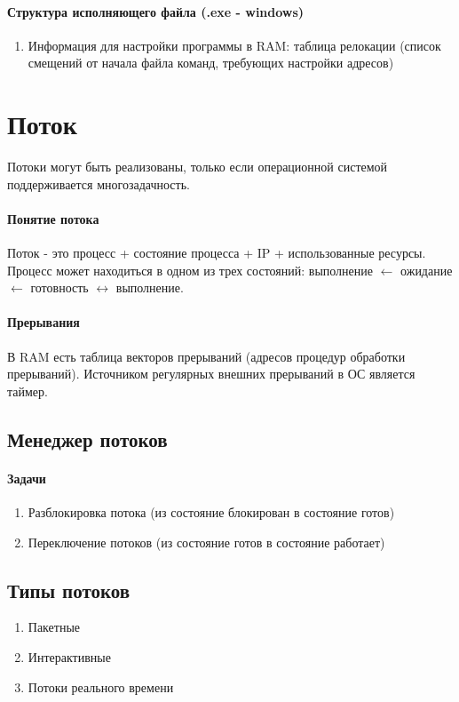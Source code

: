 \documentclass[]{article}
\begin{document}
		\paragraph{Структура исполняющего файла (.exe - windows)}
		\begin{enumerate}
			\item Информация для настройки программы в RAM: таблица релокации (список смещений от начала файла команд, требующих настройки адресов)
		\end{enumerate}
	\section{Поток}
		Потоки могут быть реализованы, только если операционной системой поддерживается многозадачность.
		
		\paragraph{Понятие потока}
		Поток - это процесс + состояние процесса + IP + использованные ресурсы. Процесс может находиться в одном из трех состояний: выполнение $\leftarrow$ ожидание $\leftarrow$ готовность $\leftrightarrow$ выполнение.
		
		\paragraph{Прерывания}
		В RAM есть таблица векторов прерываний (адресов процедур обработки прерываний). Источником регулярных внешних прерываний в ОС является таймер.
		
		\subsection{Менеджер потоков}
			\paragraph{Задачи}
			\begin{enumerate}
				\item Разблокировка потока (из состояние блокирован в состояние готов)
				\item Переключение потоков (из состояние готов в состояние работает)
			\end{enumerate}
		
		\subsection{Типы потоков}
			\begin{enumerate}
				\item Пакетные
				\item Интерактивные
				\item Потоки реального времени
			\end{enumerate}
		
\end{document}
